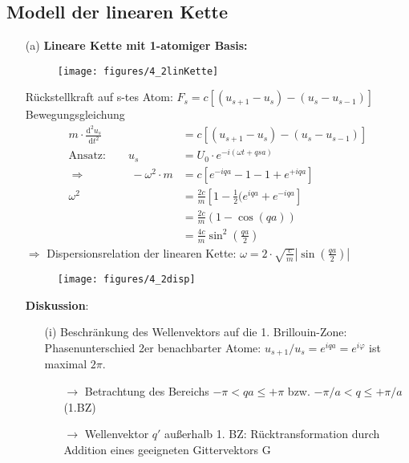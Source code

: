 \subsection{Modell der linearen Kette} \label{kap:4_2}
\begin{itemize}
	\item[(a)] \textbf{Lineare Kette mit 1-atomiger Basis:}\\
	\begin{figure}[H]
		\centering
		\texttt{[image: figures/4\_2linKette]}
		\caption{}
		\label{}
	\end{figure}
	Rückstellkraft auf s-tes Atom: $F_s = c [(u_{s+1} - u_s) - (u_s - u_{s-1})]$
	Bewegungsgleichung
	\begin{align*}
		m \cdot\frac{\mathrm{d}^2 u_s}{\mathrm{d}t^2} &= c [(u_{s+1} - u_s) - (u_s - u_{s-1})]\\
		\text{Ansatz:} \qquad u_s &= U_0 \cdot e^{-i(\omega t + q s a)}\\
		\Rightarrow \qquad \qquad -\omega^2 \cdot m &= c [e^{-iqa} -1-1+e^{+iqa}]\\
		\omega^2 &= \frac{2 c}{m} [1 - \frac{1}{2} (e^{iqa} +e^{-iqa}]\\
		&= \frac{2 c}{m} (1- \cos(qa))\\
		&= \frac{4 c}{m} \sin^2\left(\frac{qa}{2}\right)
	\end{align*}
	$\Rightarrow$ Dispersionsrelation der linearen Kette: $\omega = 2 \cdot \sqrt{\frac{c}{m}}\left|\sin\left(\frac{qa}{2}\right)\right|$ \\
	\begin{figure}[H]
		\centering
		\texttt{[image: figures/4\_2disp]}
		\caption{}
		\label{fig:4_2disrel}
	\end{figure}
	\textbf{Diskussion}: \\
	\begin{itemize}
		\item[(i)] Beschränkung des Wellenvektors auf die 1. Brillouin-Zone: \\
			Phasenunterschied 2er benachbarter Atome: $u_{s+1} / u_{s} = e^{iqa} = e^{i\varphi}$ ist maximal $2\pi$. 
			\begin{itemize}
				\item[$\rightarrow$] Betrachtung des Bereichs $-\pi < qa \le + \pi$  bzw.  $-\pi/a < q \le +\pi/a $ (1.BZ)
				\item[$\rightarrow$] Wellenvektor $q'$ außerhalb 1. BZ: Rücktransformation durch Addition eines geeigneten Gittervektors G
				\begin{align*}

\end{align*}
\end{itemize}
\end{itemize}
\end{itemize}
